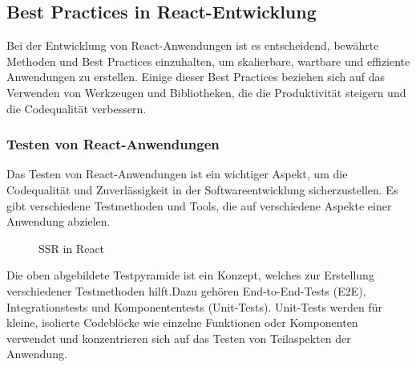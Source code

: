 \subsection{Best Practices in React-Entwicklung}
 Bei der Entwicklung von React-Anwendungen ist es entscheidend, bewährte Methoden und Best Practices einzuhalten, um skalierbare, wartbare und effiziente Anwendungen zu erstellen. Einige dieser Best Practices beziehen sich auf das Verwenden von Werkzeugen und Bibliotheken, die die Produktivität steigern und die Codequalität verbessern. 
\subsubsection{Testen von React-Anwendungen}
Das Testen von React-Anwendungen ist ein wichtiger Aspekt, um die Codequalität und Zuverlässigkeit in der Softwareentwicklung sicherzustellen. Es gibt verschiedene Testmethoden und Tools, die auf verschiedene Aspekte einer Anwendung abzielen.
\begin{figure}[htbp]
	\centering
	\caption{SSR in React}
\end{figure}
Die oben abgebildete Testpyramide ist ein Konzept, welches zur Erstellung verschiedener Testmethoden hilft.Dazu gehören End-to-End-Tests (E2E), Integrationstests und Komponententests (Unit-Tests). Unit-Tests werden für kleine, isolierte Codeblöcke wie einzelne Funktionen oder Komponenten verwendet und konzentrieren sich auf das Testen von Teilaspekten der Anwendung.

